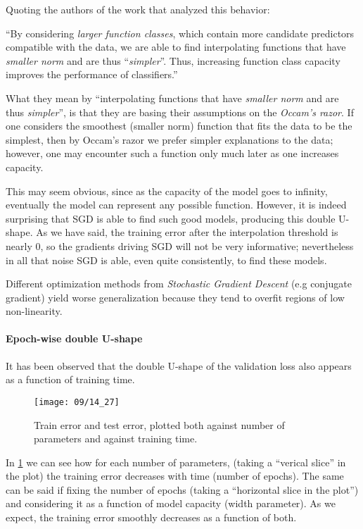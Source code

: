 Quoting the authors of the work that analyzed this behavior:
\begin{center}
    ``By considering \emph{larger function classes}, which contain more candidate predictors compatible with the data, we are able to find interpolating functions that have \emph{smaller norm} and are thus ``\emph{simpler}''. Thus, increasing function class capacity improves the performance of classifiers.''
\end{center}
What they mean by ``interpolating functions that have \emph{smaller norm} and are thus \emph{simpler}'', is that they are basing their assumptions on the \emph{Occam's razor}. If one considers the smoothest (smaller norm) function that fits the data to be the simplest, then by Occam's razor we prefer simpler explanations to the data; however, one may encounter such a function only much later as one increases capacity.

This may seem obvious, since as the capacity of the model goes to infinity, eventually the model can represent any possible function. However, it is indeed surprising that SGD is able to find such good models, producing this double U-shape. As we have said, the training error after the interpolation threshold is nearly $0$, so the gradients driving SGD will not be very informative; nevertheless in all that noise SGD is able, even quite consistently, to find these models.


Different optimization methods from \emph{Stochastic Gradient Descent} (e.g conjugate gradient) yield 
worse generalization because they tend to overfit regions of low non-linearity.\\



\paragraph{Epoch-wise double U-shape}

It has been observed that the double U-shape of the validation loss also appears as a function of training time.

\begin{figure}[H]
    \centering
    \texttt{[image: 09/14\_27]}
    \caption{Train error and test error, plotted both against number of parameters and against training time.}
    \label{fig:09:2:double-u-time}
\end{figure}

In \cref{fig:09:2:double-u-time} we can see how for each number of parameters, (taking a ``verical slice'' in the plot) the training error decreases with time (number of epochs). The same can be said if fixing the number of epochs (taking a ``horizontal slice in the plot'') and  considering it as a function of model capacity (width parameter). As we expect, the training error smoothly decreases as a function of both.

